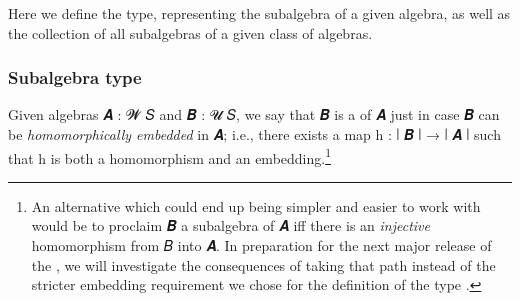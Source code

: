 Here we define the  type, representing the subalgebra of a given algebra, as well as the collection of all subalgebras of a given class of algebras.

\subsubsection{Subalgebra type}\label{subalgebra-type}

Given algebras \ab 𝑨 \as :  \ab 𝓦 \ab 𝑆 and \ab 𝑩 \as :  \ab 𝓤 \ab 𝑆, we say that \ab 𝑩 is a  of \ab 𝑨 just in case \ab 𝑩 can be \emph{homomorphically embedded} in \ab 𝑨; i.e., there exists a map \ab h \as : \af ∣ \ab 𝑩 \af ∣ \as → \af ∣ \ab 𝑨 \af ∣ such that \ab h is both a homomorphism and an embedding.\footnote{%
An alternative which could end up being simpler and easier to work with would be to proclaim \ab 𝑩 a subalgebra of \ab 𝑨 iff there is an \emph{injective} homomorphism from \ab 𝐵 into \ab 𝑨.  In preparation for the next major release of the \ualib, we will investigate the consequences of taking that path instead of the stricter embedding requirement we chose for the definition of the type .}
\ccpad
